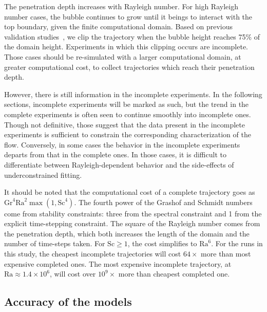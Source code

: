 The penetration depth increases with Rayleigh number.
For high Rayleigh number cases, the bubble continues to grow until it beings to interact with the top boundary, given the finite computational domain.
Based on previous validation studies~\cite{Hutchinson2016}, we clip the trajectory when the bubble height reaches 75\% of the domain height.
Experiments in which this clipping occurs are incomplete.
Those cases should be re-simulated with a larger computational domain, at greater computational cost, to collect trajectories which reach their penetration depth.

However, there is still information in the incomplete experiments.
In the following sections, incomplete experiments will be marked as such, but the trend in the complete experiments is often seen to continue smoothly into incomplete ones.
Though not definitive, those suggest that the data present in the incomplete experiments is sufficient to constrain the corresponding characterization of the flow.
Conversely, in some cases the behavior in the incomplete experiments departs from that in the complete ones. 
In those cases, it is difficult to differentiate between Rayleigh-dependent behavior and the side-effects of underconstrained fitting.

It should be noted that the computational cost of a complete trajectory goes as $\text{Gr}^4 \text{Ra}^2 \max(1, \text{Sc}^4)$.
The fourth power of the Grashof and Schmidt numbers come from stability constraints: three from the spectral constraint and 1 from the explicit time-stepping constraint.
The square of the Rayleigh number comes from the penetration depth, which both increases the length of the domain and the number of time-steps taken.
For $\text{Sc} \ge 1$, the cost simplifies to $\text{Ra}^6$.
For the runs in this study, the cheapest incomplete trajectories will cost $64\times$ more than most expensive completed ones.
The most expensive incomplete trajectory, at $\text{Ra} \approx 1.4\times 10^6$, will cost over $10^9\times$ more than cheapest completed one.

\subsection{Accuracy of the models}

